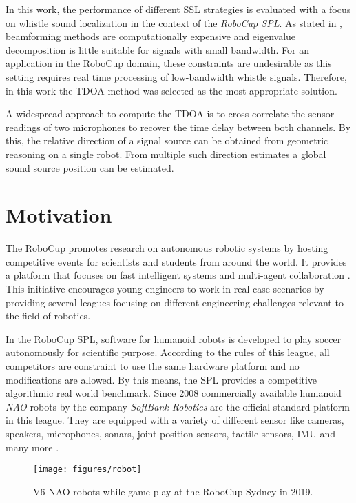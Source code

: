 In this work, the performance of different \ac{SSL} strategies is evaluated
with a focus on whistle sound localization in the context of the
\textit{\acs{RoboCup} \ac{SPL}}.
As stated in \cite{BAS_estimator}, beamforming methods are computationally
expensive and eigenvalue decomposition is little suitable for signals with
small bandwidth. For an application in the \acs{RoboCup} domain, these constraints
are undesirable as this setting requires real time processing of low-bandwidth
whistle signals.
Therefore, in this work the \ac{TDOA} method was selected as the
most appropriate solution.

A widespread approach to compute the \ac{TDOA} is to cross-correlate the sensor
readings of two microphones to recover the time delay between both channels. By
this, the relative direction of a signal source can be obtained from
geometric reasoning on a single robot. From multiple such direction estimates
a global sound source position can be estimated.

\section{Motivation}

The \acf{RoboCup} promotes research on autonomous robotic systems
by hosting competitive events for  scientists and students from around the
world.
It provides a platform that focuses on fast intelligent systems and multi-agent
collaboration \cite{robocup}. This initiative encourages young engineers to
work in real case scenarios by providing several leagues focusing on different
engineering challenges relevant to the field of robotics.

In the \ac{RoboCup} \acf{SPL}, software for humanoid robots is developed to
play soccer autonomously for scientific purpose.
According to the rules of this league, all competitors are constraint to use the
same hardware platform and no modifications are allowed. By this means, the \ac{SPL}
provides a competitive algorithmic real world benchmark.
Since 2008 commercially available humanoid \textit{NAO} robots by the company
\textit{SoftBank Robotics} are the official standard platform in this league.
They are equipped with a variety of different sensor like cameras, speakers,
microphones, sonars, joint position sensors, tactile sensors, \ac{IMU}
and many more \cite{nao_docu}.
\begin{figure}[ht]
	\centering
        \texttt{[image: figures/robot]}
	\caption[NAO robot]{V6 NAO robots while game play at the \ac{RoboCup} Sydney in 2019.}
	\label{fig:01_robot}
\end{figure}

